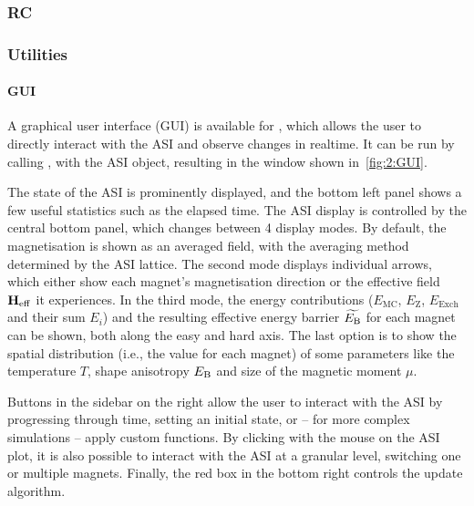 \subsubsection{RC} %
\subsubsection{Utilities} %
\paragraph{GUI}
A graphical user interface (GUI) is available for \hotspice, which allows the user to directly interact with the ASI and observe changes in realtime. It can be run by calling , with  the ASI object, resulting in the window shown in~\cref{fig:2:GUI}.


The state of the ASI is prominently displayed, and the bottom left panel shows a few useful statistics such as the elapsed time. The ASI display is controlled by the central bottom panel, which changes between 4 display modes.
By default, the magnetisation is shown as an averaged field, with the averaging method determined by the ASI lattice.
The second mode displays individual arrows, which either show each magnet's magnetisation direction or the effective field $\boldsymbol{\mathbf{H}}_\mathrm{eff}$ it experiences. %
In the third mode, the energy contributions ($E_\mathrm{MC}$, $E_\mathrm{Z}$, $E_\mathrm{Exch}$ and their sum $E_i$) and the resulting effective energy barrier $\widetilde{E_\mathrm{B}}$ for each magnet can be shown, both along the easy and hard axis.
The last option is to show the spatial distribution (i.e., the value for each magnet) of some parameters like the temperature $T$, shape anisotropy $E_\mathrm{B}$ and size of the magnetic moment $\mu$. \par
Buttons in the sidebar on the right allow the user to interact with the ASI by progressing through time, setting an initial state, or -- for more complex simulations -- apply custom functions.
By clicking with the mouse on the ASI plot, it is also possible to interact with the ASI at a granular level, switching one or multiple magnets. Finally, the red box in the bottom right controls the update algorithm.

